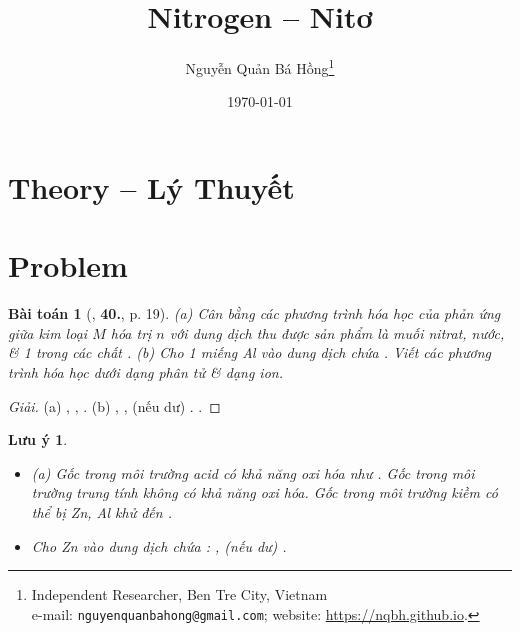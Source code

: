 \documentclass{article}
\title{Nitrogen -- Nitơ}
\author{Nguyễn Quản Bá Hồng\footnote{Independent Researcher, Ben Tre City, Vietnam\\e-mail: \texttt{nguyenquanbahong@gmail.com}; website: \url{https://nqbh.github.io}.}}
\date{\today}
\numberwithin{equation}{section}
\newtheorem{baitoan}{Bài toán}
\newtheorem{luuy}{Lưu ý}[section]
\begin{document}
\maketitle
\begin{abstract}
	
\end{abstract}
\setcounter{secnumdepth}{4}
\setcounter{tocdepth}{3}
\tableofcontents


\section{Theory -- Lý Thuyết}
\cite[pp. 38--]{An_Hoa_Hoc_nang_cao_11_2020}

\section{Problem}

\begin{baitoan}[\cite{An_400_BT_Hoa_Hoc_11_2021}, \textbf{40.}, p. 19]
	(a) Cân bằng các phương trình hóa học của phản ứng giữa kim loại $M$ hóa trị $n$ với dung dịch \emph{} thu được sản phẩm là muối nitrat, nước, \& 1 trong các chất \emph{}. (b) Cho 1 miếng \emph{Al} vào dung dịch chứa \emph{}. Viết các phương trình hóa học dưới dạng phân tử \& dạng ion.
\end{baitoan}

\begin{proof}[Giải]
	(a) , , . (b) , ,  (nếu dư) . .
\end{proof}

\begin{luuy} 
	\begin{itemize}
		\item (a) Gốc \emph{} trong môi trường acid có khả năng oxi hóa như \emph{}. Gốc \emph{} trong môi trường trung tính không có khả năng oxi hóa. Gốc \emph{} trong môi trường kiềm có thể bị \emph{Zn, Al} khử đến \emph{}.
		\item[(b)] Cho \emph{Zn} vào  dung dịch chứa \emph{}: \emph{,  (nếu dư) }.
	\end{itemize}	 
\end{luuy}
\end{document}
